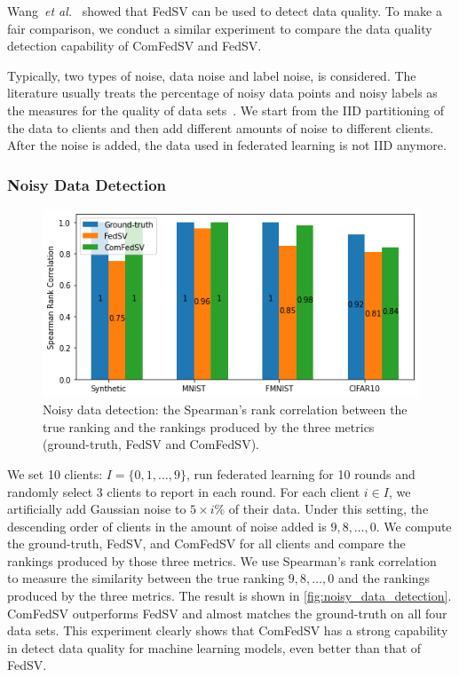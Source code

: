 Wang~\textit{et al.}~\cite{wang2020principled} showed that FedSV can be used to detect data quality.  To make a fair comparison, we conduct a similar experiment to compare the data quality detection capability of ComFedSV and FedSV.

Typically, two types of noise, data noise and label noise, is considered. The literature usually treats the percentage of noisy data points and noisy labels as the measures for the quality of data sets~\citep{liebchen2008data, karimi2020deep}. 
We start from the IID partitioning of the data to clients and then add different amounts of noise to different clients. After the noise is added, the data used in federated learning is not IID anymore.

\subsubsection{Noisy Data Detection}

\begin{figure}[t]
    \centering
    \includegraphics[width=.7\linewidth]{./figures/data_noise_detection.png}
    \caption{Noisy data detection: the Spearman’s  rank  correlation between the true ranking and the rankings produced by the three metrics (ground-truth, FedSV and ComFedSV).}
    \label{fig:noisy_data_detection}
\end{figure}

We set 10 clients: $I = \{0, 1, \dots, 9\}$, run federated learning for 10 rounds and randomly select 3 clients to report in each round. For each client $i \in I$, we artificially add Gaussian noise to $5\times i\%$ of their data. Under this setting, the descending order of clients in the amount of noise added is $9, 8, \dots, 0$.  We compute the ground-truth, FedSV, and ComFedSV for all clients and compare the rankings produced by those three metrics. We use Spearman's rank correlation~\citep{zar1972significance,zar2005spearman} to measure the similarity between the true ranking $9, 8, \dots, 0$ and the rankings produced by the three metrics. The result is shown in \autoref{fig:noisy_data_detection}. ComFedSV outperforms FedSV and almost matches the ground-truth on all four data sets. This experiment clearly shows that ComFedSV has a strong capability in detect data quality for machine learning models, even better than that of FedSV.

